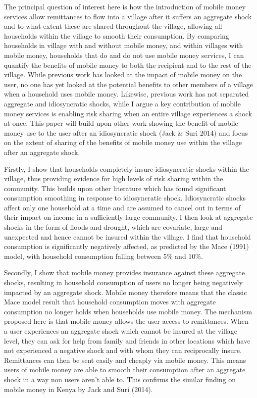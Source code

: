 The principal question of interest here is how the introduction of mobile money services allow remittances to flow into a village after it suffers an aggregate shock and to what extent these are shared throughout the village, allowing all households within the village to smooth their consumption. By comparing households in village with and without mobile money, and within villages with mobile money, households that do and do not use mobile money services, I can quantify the benefits of mobile money to both the recipient and to the rest of the village. While previous work has looked at the impact of mobile money on the user, no one has yet looked at the potential benefits to other members of a village when a household uses mobile money. Likewise, previous work has not separated aggregate and idiosyncratic shocks, while I argue a key contribution of mobile money services is enabling risk sharing when an entire village experiences a shock at once. This paper will build upon other work showing the benefit of mobile money use to the user after an idiosyncratic shock (Jack \& Suri 2014) and focus on the extent of sharing of the benefits of mobile money use within the village after an aggregate shock. 
 
Firstly, I show that households completely insure idiosyncratic shocks within the village, thus providing evidence for high levels of  risk sharing within the community. This builds upon other literature which has found significant consumption smoothing in response to idiosyncratic shock. Idiosyncratic shocks affect only one household at a time and are assumed to cancel out in terms of their impact on income in a sufficiently large community. I then look at aggregate shocks in the form of floods and drought, which are covariate, large and unexpected and hence cannot be insured within the village. I find that household consumption is significantly negatively affected, as predicted by the Mace (1991) model, with household consumption falling between 5\% and 10\%.  

Secondly, I show that mobile money provides insurance against these aggregate shocks, resulting in household consumption of users no longer being negatively impacted by an aggregate shock. Mobile money therefore means that the classic Mace model result that household consumption moves with aggregate consumption no longer holds when households use mobile money. The mechanism proposed here is that mobile money allows the user access to remittances. When a user experiences an aggregate shock which cannot be insured at the village level, they can ask for help from family and friends in other locations which have not experienced a negative shock and with whom they can reciprocally insure. Remittances can then be sent easily and cheaply via mobile money. This means users of mobile money are able to smooth their consumption after an aggregate shock in a way non users aren't able to. This confirms the similar finding on mobile money in Kenya by Jack and Suri (2014).   

